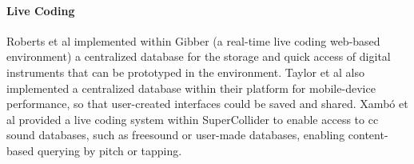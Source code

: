 \paragraph{Live Coding}
Roberts et al \parencite{croberts:2014} implemented within Gibber (a real-time live coding web-based environment) a centralized database for the storage and quick access of digital instruments that can be prototyped in the environment. Taylor et al \parencite{btaylor:2014} also implemented a centralized database within their platform for mobile-device performance, so that user-created interfaces could be saved and shared. Xambó et al \parencite{nime18-Xambo-b} provided a live coding system within SuperCollider to enable access to \gls{cc} sound databases, such as \gls{freesound} or user-made databases, enabling content-based querying by pitch or tapping.
